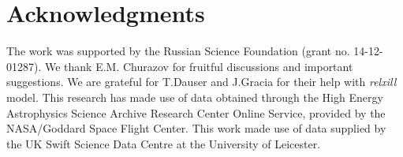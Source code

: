 \documentclass[a4paper,fleqn,usenatbib]{mnras}
\begin{document}
\section*{Acknowledgments}
The work was supported by the Russian Science Foundation (grant no. 14-12-01287). 
We thank E.M. Churazov for fruitful discussions and important suggestions. 
We are grateful for T.Dauser and J.Gracia for their help with {\em relxill} model. 
This research has made use of data obtained through the High Energy Astrophysics Science Archive Research Center Online Service, provided by the NASA/Goddard Space Flight Center.
This work made use of data supplied by the UK Swift Science Data Centre at the University of Leicester.



\bsp	
\label{lastpage}
\end{document}
